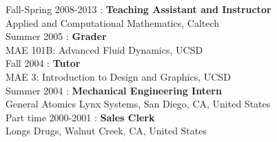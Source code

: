 
\noindent Fall-Spring 2008-2013 : \textbf{Teaching Assistant and Instructor}\\
Applied and Computational Mathematics, Caltech\\


\noindent Summer 2005 : \textbf{Grader}\\
 MAE 101B: Advanced Fluid Dynamics, UCSD\\

\noindent Fall 2004 : \textbf{Tutor}\\
 MAE 3: Introduction to Design and Graphics, UCSD\\

\noindent Summer 2004 : \textbf{Mechanical Engineering Intern}\\
General Atomics Lynx Systems, San Diego, CA, United States\\


\noindent Part time 2000-2001 : \textbf{Sales Clerk}\\
Longs Drugs, Walnut Creek, CA, United States\\
